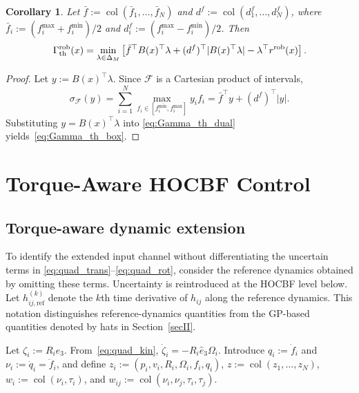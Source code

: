 \documentclass[journal,twoside,web]{ieeecolor}
\newtheorem{corollary}[theorem]{Corollary}
\begin{document}
\medskip

\begin{corollary}
Let $\bar f:=\operatorname{col}(\bar f_1,\ldots,\bar f_N)$ and
$d^f:=\operatorname{col}(d_1^f,\ldots,d_N^f)$, where
$\bar f_i:=(f_i^{\max}+f_i^{\min})/2$ and
$d_i^f:=(f_i^{\max}-f_i^{\min})/2$. Then
\begin{equation}
    \Gamma_{\rm th}^{\rm rob}(x)
    =
    \min_{\lambda\in\Delta_M}
    \left[
        \bar f^\top B(x)^\top\lambda
        +
        (d^f)^\top|B(x)^\top\lambda|
        -
        \lambda^\top r^{\rm rob}(x)
    \right].
    \label{eq:Gamma_th_box}
\end{equation}
\end{corollary}

\begin{proof}
Let $y:=B(x)^\top\lambda$. Since $\mathcal F$ is a Cartesian
product of intervals,
\[
    \sigma_{\mathcal F}(y)
    =
    \sum_{i=1}^N
    \max_{f_i\in[f_i^{\min},f_i^{\max}]}y_i f_i
    =
    \bar f^\top y+(d^f)^\top|y|.
\]
Substituting $y=B(x)^\top\lambda$ into
\eqref{eq:Gamma_th_dual} yields~\eqref{eq:Gamma_th_box}.
\end{proof}




\section{Torque-Aware HOCBF Control}
\label{sec:singularity_free}


\subsection{Torque-aware dynamic extension}\label{secIIIB}

To identify the extended input channel without differentiating
the uncertain terms in
\eqref{eq:quad_trans}--\eqref{eq:quad_rot},
consider the reference dynamics obtained by omitting these
terms. Uncertainty is reintroduced at the HOCBF level below.
Let $h_{ij,\mathrm{ref}}^{(k)}$ denote the $k$th time
derivative of $h_{ij}$ along the reference dynamics. This
notation distinguishes reference-dynamics quantities from the
GP-based quantities denoted by hats in Section~\ref{secII}.

Let $\zeta_i:=R_ie_3$. From~\eqref{eq:quad_kin},
$\dot\zeta_i=-R_i\widehat e_3\Omega_i$.
Introduce $q_i:=\dot f_i$ and
$\nu_i:=\dot q_i=\ddot f_i$, and define
$z_i:=(p_i,v_i,R_i,\Omega_i,f_i,q_i)$, $z:=\operatorname{col}(z_1,\ldots,z_N)$, $w_i:=\operatorname{col}(\nu_i,\tau_i)$, and
$w_{ij}:=\operatorname{col}(\nu_i,\nu_j,\tau_i,\tau_j)$.
\end{document}

